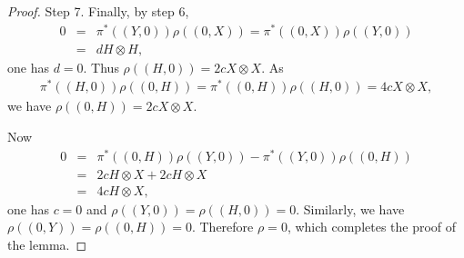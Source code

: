 \documentclass[10pt,a4paper]{amsart}
\begin{document}
\begin{proof}
Step 7. Finally, by step 6,
\begin{eqnarray*}
0 &=& \pi^{\ast}((Y,0))\rho((0,X))=\pi^{\ast}((0,X))\rho((Y,0))\\
  &=& d H\otimes H,
\end{eqnarray*}
one has $d=0$. Thus $\rho((H,0))=2c X\otimes X$. As
\begin{eqnarray*}
\pi^{\ast}((H,0))\rho((0,H))=\pi^{\ast}((0,H))\rho((H,0))=4cX\otimes X,
\end{eqnarray*}
we have $\rho((0,H))=2cX\otimes X$.

Now
\begin{eqnarray*}
0 &=& \pi^{\ast}((0,H))\rho((Y,0))-\pi^{\ast}((Y,0))\rho((0,H))\\
  &=& 2cH\otimes X+2cH\otimes X\\
  &=& 4cH\otimes X,
\end{eqnarray*}
one has $c=0$ and $\rho((Y,0))=\rho((H,0))=0$. Similarly, we have $\rho((0,Y))=\rho((0,H))=0$.
Therefore $\rho=0$, which completes the proof of the lemma.
\end{proof}
\end{document}
